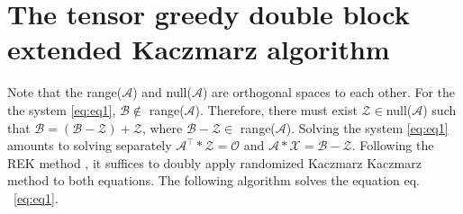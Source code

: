 \documentclass[11pt]{article}
\def\fm#1{\mathcal{#1}}
\begin{document}
\section{The tensor greedy double block extended Kaczmarz algorithm}\label{sec:tdgbek}

Note that the range($\fm A $) and null($\fm A$) are orthogonal spaces to each other. For the the system  \eqref{eq:eq1}, $\fm B \notin$ range($\fm A $). Therefore, there must exist $\fm Z \in $null($\fm A$) such that $\fm B= (\fm B - \fm Z )  + \fm Z $, where $\fm B- \fm Z \in $ range($\fm A$). Solving the system \eqref{eq:eq1}  amounts to solving separately $\fm A^\top * \fm Z = \fm O$ and $\fm A* \fm X = \fm B - \fm Z$. Following the REK method \cite{zouzias2013rando}, it suffices to doubly apply randomized Kaczmarz Kaczmarz method to both equations. The following algorithm solves the equation eq. ~\eqref{eq:eq1}.

\end{document}

